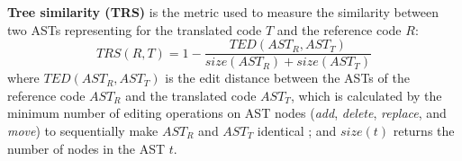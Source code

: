 \textbf{Tree similarity (TRS)} is the metric used to measure
the similarity between two ASTs representing for the translated code $T$
and the reference code $R$:
$$TRS(R, T) = 1 -\frac{TED(AST_R, AST_T)}{size(AST_R) + size(AST_T)}$$ where $TED(AST_R, AST_T)$ is the edit
distance between the ASTs of the reference code $AST_R$ and the
translated code $AST_T$, which is calculated by the minimum number of
editing operations on AST nodes ({\em add}, {\em delete}, {\em
  replace}, and {\em move}) to sequentially make $AST_R$ and $AST_T$
identical \cite{oopsla10}; and $size(t)$ returns the number of
nodes in the AST $t$.
%
%
%

%

